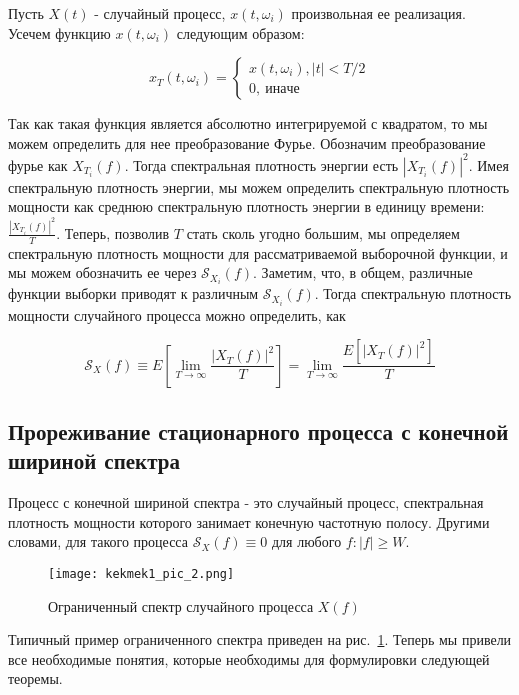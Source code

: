 Пусть $X(t)$ - случайный процесс, $x(t, \omega_i)$ произвольная ее реализация.
Усечем функцию $x(t, \omega_i)$ следующим образом:

{\centering 
\begin{equation}
x_T(t, \omega_i)  = 
\left\{
    \begin{array}{lr}
         x(t, \omega_i), |t| < T/2 \\
         0, \ иначе
    \end{array} 
\right.
\end{equation}
}

Так как такая функция является абсолютно интегрируемой с квадратом, то мы можем определить для нее преобразование Фурье. Обозначим преобразование фурье как $X_{T_i} (f)$. Тогда спектральная плотность энергии есть $|X_{T_i} (f)|^2$. Имея спектральную плотность энергии, мы можем
определить спектральную плотность мощности как среднюю спектральную плотность энергии в единицу времени: 
$\frac{|X_{T_i} (f)|^2}{T}$. Теперь, позволив $T$ стать сколь угодно большим, мы определяем спектральную
плотность мощности для рассматриваемой выборочной функции, и мы можем обозначить ее через $\mathcal{S}_{X_i} (f)$. Заметим, что, в общем, различные функции выборки приводят к различным
$\mathcal{S}_{X_i} (f)$. Тогда спектральную плотность мощности случайного процесса можно определить, как

{
\centering
\begin{equation}
    \mathcal{S}_X (f) \equiv E \left[ \lim\limits_{T\to\infty}\frac{|X_{T} (f)|^2}{T} \right] = \lim\limits_{T\to\infty}\frac{E \left[ |X_{T} (f)|^2 \right]}{T}
\end{equation}
}

\subsection{Прореживание стационарного процесса с конечной шириной спектра}

Процесс с конечной шириной спектра - это случайный процесс, спектральная плотность мощности которого занимает
конечную частотную полосу. Другими словами, для такого процесса 
$\mathcal{S}_X (f) \equiv 0$ для любого $f: |f| \geq W $.

\begin{figure}[h]
\centering
\texttt{[image: kekmek1\_pic\_2.png]}
\caption{Ограниченный спектр случайного процесса $X(f)$}
\label{fig:X(f)}
\end{figure}
Типичный пример ограниченного спектра приведен на рис.~\ref{fig:X(f)}.
Теперь мы привели все необходимые понятия, которые необходимы для формулировки следующей теоремы.

